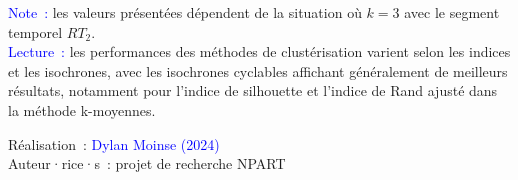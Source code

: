     \begin{table}[h!]
    \centering
    \renewcommand{\arraystretch}{1.5}
    \caption{Revue des performances globales des méthodes de clustérisation.}
    \label{table-chap6:valeurs-indices-sc-ch-ari-jc}
        \vspace{5pt}
        \begin{flushleft}\scriptsize{
        \textcolor{blue}{Note~:} les valeurs présentées dépendent de la situation où \(k = 3\) avec le segment temporel \(RT_{2}\).
        \\
        \textcolor{blue}{Lecture~:} les performances des méthodes de clustérisation varient selon les indices et les isochrones, avec les isochrones cyclables affichant généralement de meilleurs résultats, notamment pour l'indice de silhouette et l'indice de Rand ajusté dans la méthode k-moyennes.
        }\end{flushleft}
        \begin{flushright}\scriptsize{
        Réalisation~: \textcolor{blue}{Dylan Moinse (2024)}
        \\
        Auteur·rice·s~: projet de recherche \acrshort{NPART}
        }\end{flushright}
        \end{table}